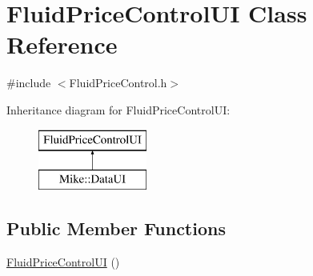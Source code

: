 \hypertarget{class_fluid_price_control_u_i}{}\section{Fluid\+Price\+Control\+UI Class Reference}
\label{class_fluid_price_control_u_i}


{\ttfamily \#include $<$Fluid\+Price\+Control.\+h$>$}

Inheritance diagram for Fluid\+Price\+Control\+UI\+:\begin{figure}[H]
\begin{center}
\leavevmode
\includegraphics[height=2.000000cm]{class_fluid_price_control_u_i}
\end{center}
\end{figure}
\subsection*{Public Member Functions}
\begin{DoxyCompactItemize}
\item 
\hyperlink{class_fluid_price_control_u_i_a2cda3cd2bdafd0550ffd992166db9f9b}{Fluid\+Price\+Control\+UI} ()
\end{DoxyCompactItemize}
